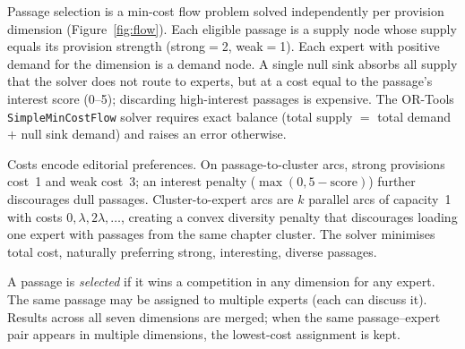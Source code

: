 \documentclass[final]{clv2025}
\begin{document}
Passage selection is a min-cost flow problem solved independently per
provision dimension (Figure~\ref{fig:flow}).  Each eligible passage is
a supply node whose supply equals its provision strength (strong${}={}$2,
weak${}={}$1).  Each expert with positive demand for the dimension is a
demand node.  A single null sink absorbs all supply that the solver
does not route to experts, but at a cost equal to the passage's
interest score (0--5); discarding high-interest passages is expensive.  The OR-Tools \texttt{SimpleMinCostFlow} solver requires exact
balance (total supply $=$ total demand $+$ null sink demand) and
raises an error otherwise.

Costs encode editorial preferences.  On passage-to-cluster arcs,
strong provisions cost~1 and weak cost~3; an interest penalty
($\max(0, 5 - \text{score})$) further discourages dull passages.
Cluster-to-expert arcs are $k$ parallel arcs of capacity~1 with costs
$0, \lambda, 2\lambda, \ldots$, creating a convex diversity penalty
that discourages loading one expert with passages from the same
chapter cluster.  The solver minimises total cost, naturally preferring
strong, interesting, diverse passages.

A passage is \emph{selected} if it wins a competition in any dimension
for any expert.  The same passage may be assigned to multiple experts
(each can discuss it).  Results across all seven dimensions are merged;
when the same passage--expert pair appears in multiple dimensions, the
lowest-cost assignment is kept.
\end{document}
